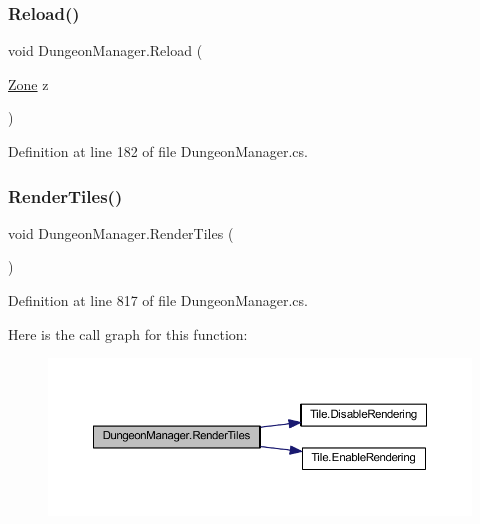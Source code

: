 \subsubsection{\texorpdfstring{Reload()}{Reload()}}
{\footnotesize\ttfamily void Dungeon\+Manager.\+Reload (\begin{DoxyParamCaption}\item[{\mbox{\hyperlink{class_dungeon_manager_a6558d4a01889674bf25c798f1b90a431}{Zone}}}]{z }\end{DoxyParamCaption})}



Definition at line 182 of file Dungeon\+Manager.\+cs.

\mbox{\label{class_dungeon_manager_a89bde2dbae3ffb1dd89635df4a8df153}} 
\subsubsection{\texorpdfstring{RenderTiles()}{RenderTiles()}}
{\footnotesize\ttfamily void Dungeon\+Manager.\+Render\+Tiles (\begin{DoxyParamCaption}{ }\end{DoxyParamCaption})}



Definition at line 817 of file Dungeon\+Manager.\+cs.

Here is the call graph for this function\+:
\nopagebreak
\begin{figure}[H]
\begin{center}
\leavevmode
\includegraphics[width=350pt]{class_dungeon_manager_a89bde2dbae3ffb1dd89635df4a8df153_cgraph}
\end{center}
\end{figure}
\mbox{\label{class_dungeon_manager_a010c39db85d745cd24e4e960d248ab4a}} 
